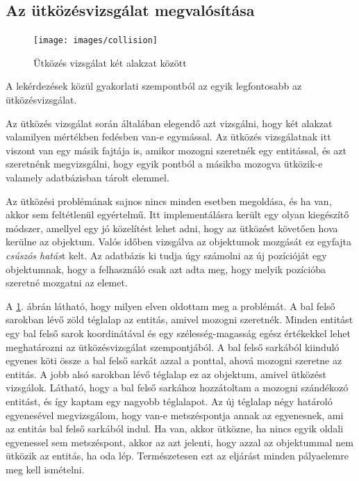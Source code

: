 \subsection{Az ütközésvizsgálat megvalósítása}

\begin{figure}[htb]
\begin{center}
    \texttt{[image: images/collision]}
    \caption{Ütközés vizsgálat két alakzat között}
    \label{fig:collision}
\end{center}
\end{figure}

A lekérdezések közül gyakorlati szempontból az egyik legfontosabb az ütközésvizsgálat.

Az ütközés vizsgálat során általában elegendő azt vizsgálni, hogy két alakzat valamilyen mértékben fedésben van-e egymással. Az ütközés vizsgálatnak itt viszont van egy másik fajtája is, amikor mozogni szeretnék egy entitással, és azt szeretnénk megvizsgálni, hogy egyik pontból a másikba mozogva ütközik-e valamely adatbázisban tárolt elemmel.

Az ütközési problémának sajnos nincs minden esetben megoldása, és ha van, akkor sem feltétlenül egyértelmű. Itt implementálásra került egy olyan kiegészítő módszer, amellyel egy jó közelítést lehet adni, hogy az ütközést követően hova kerülne az objektum. Valós időben vizsgálva az objektumok mozgását ez egyfajta \textit{csúszós hatás}t kelt. Az adatbázis ki tudja úgy számolni az új pozícióját egy objektumnak, hogy a felhasználó csak azt adta meg, hogy melyik pozícióba szeretné mozgatni az elemet.

A \ref{fig:collision}. ábrán látható, hogy milyen elven oldottam meg a problémát. A bal fels\H o sarokban lév\H o zöld téglalap az entitás, amivel mozogni szeretnék. Minden entitást egy bal fels\H o sarok koordinátával és egy szélesség-magasság egész értékekkel lehet meghatározni az ütközésvizsgálat szempontjából. A bal fels\H o sarkából kiinduló egyenes köti össze a bal fels\H o sarkát azzal a ponttal, ahová mozogni szeretne az entitás. A jobb alsó sarokban lév\H o téglalap ez az objektum, amivel ütközést vizsgálok. Látható, hogy a bal fels\H o sarkához hozzátoltam a mozogni szándékozó entitást, és így kaptam egy nagyobb téglalapot.
Az új téglalap négy határoló egyenesével megvizsgálom, hogy van-e metszéspontja annak az egyenesnek, ami az entitás bal fels\H o sarkából indul. Ha van, akkor ütközne, ha nincs egyik oldali egyenessel sem metszéspont, akkor az azt jelenti, hogy azzal az objektummal nem ütközik az entitás, ha oda lép. Természetesen ezt az eljárást minden pályaelemre meg kell ismételni.

